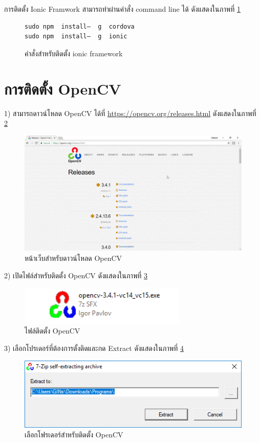     การติดตั้ง Ionic Framwork สามารถทำผ่านคำสั่ง command line ได้ ดังแสดงในภาพที่ \ref{Fig:ionicInstall}
    \begin{figure}[H]
		{\begin{lstlisting}[numbers=none]
sudo npm  install–  g  cordova  
sudo npm  install–  g  ionic                
		\end{lstlisting}}
		\caption{คำสั่งสำหรับติดตั้ง ionic framework}
		\label{Fig:ionicInstall}
    \end{figure}
    
\section{การติดตั้ง OpenCV}
    1) สามารถดาวน์โหลด OpenCV ได้ที่ \url{https://opencv.org/releases.html} ดังแสดงในภาพที่ \ref{Fig:opencvInstall1}
      \begin{figure}[H]
          \includegraphics[width=\columnwidth]{Figures/7/7}
          \caption{หน้าเว็บสำหรับดาวน์โหลด OpenCV}
          \label{Fig:opencvInstall1}
      \end{figure}

    2) เปิดไฟล์สำหรับติดตั้ง OpenCV ดังแสดงในภาพที่ \ref{Fig:opencvInstall2}
      \begin{figure}[H]
            \centering
          \includegraphics[width=8cm]{Figures/7/8}
          \caption{ไฟล์ติดตั้ง OpenCV}
          \label{Fig:opencvInstall2}
      \end{figure}

    3) เลือกโปรเดอร์ที่ต้องการตั้งติดและกด Extract ดังแสดงในภาพที่ \ref{Fig:opencvInstall3}
      \begin{figure}[H]
        \centering
          \includegraphics[width=\columnwidth]{Figures/7/9}
          \caption{เลือกโฟรเดอร์สำหรับติดตั้ง OpenCV}
          \label{Fig:opencvInstall3}
      \end{figure}

